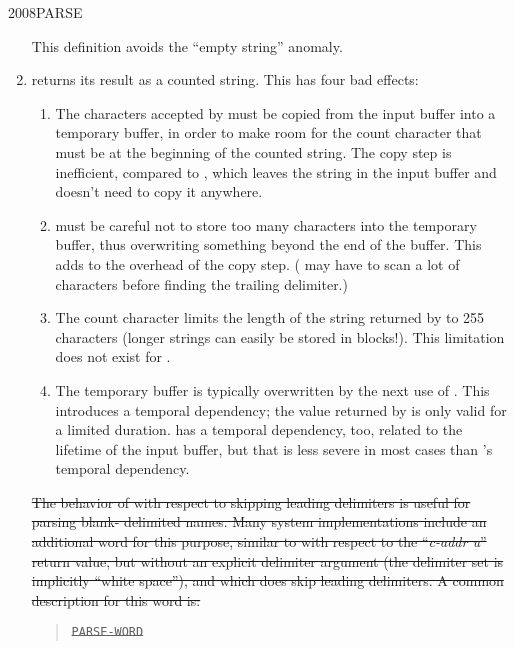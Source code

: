\begin{worddef}{2008}{PARSE}
\begin{rationale}
\begin{enumerate}
			This definition avoids the ``empty string'' anomaly.

		\item {} returns its result as a counted string.
			This has four bad effects:

			\begin{enumerate}
			\item The characters accepted by  must be
				copied from the input buffer into a temporary buffer,
				in order to make room for the count character that
				must be at the beginning of the counted string. The
				copy step is inefficient, compared to ,
				which leaves the string in the input buffer and doesn't
				need to copy it anywhere.

			\item {} must be careful not to store too many
				characters into the temporary buffer, thus overwriting
				something beyond the end of the buffer. This adds to
				the overhead of the copy step. ( may have
				to scan a lot of characters before finding the trailing
				delimiter.)

			\item The count character limits the length of the string
				returned by  to 255 characters (longer
				strings can easily be stored in blocks!). This
				limitation does not exist for .

			\item The temporary buffer is typically overwritten by the
				next use of . This introduces a temporal
				dependency; the value returned by  is only
				valid for a limited duration.  has a
				temporal dependency, too, related to the lifetime of
				the input buffer, but that is less severe in most
				cases than 's temporal dependency.
			\end{enumerate}

\cbstart{}
\sout{%
			The behavior of  with respect to skipping
			leading delimiters is useful for parsing blank- delimited
			names. Many system implementations include an additional
			word for this purpose, similar to  with respect
			to the ``\emph{c-addr u}'' return value, but without an
			explicit delimiter argument (the delimiter set is implicitly
			``white space''), and which does skip leading delimiters. A
			common description for this word is:}

			\begin{quote}
				\sout{\texttt{PARSE-WORD}} \qquad
					 \\


\end{quote}
\end{enumerate}
\end{rationale}
\end{worddef}
